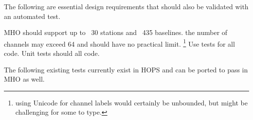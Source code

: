 The following are essential design requirements that should also
be validated with an automated test.

\begin{description}
 \ac{MHO} should support up to
    \TBD~30 stations and \TBD~435 baselines.
 the number of \acsp{channel} may exceed 64 and should
    have no practical limit.
    \footnote{using \acs{Unicode} for channel labels would certainly
    be unbounded, but might be challenging for some to type.}
 Use  tests for all code.
 Unit tests should  all code.
\end{description}

The following existing tests currently exist in \ac{HOPS}
and can be ported to pass in \ac{MHO} as well.

